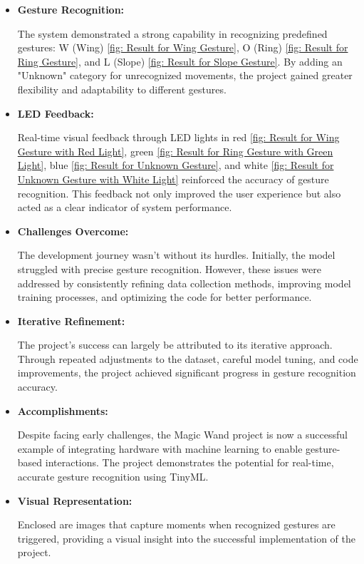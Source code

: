 \begin{itemize}
	
	\item \textbf{Gesture Recognition:}
	
	The system demonstrated a strong capability in recognizing predefined gestures: W (Wing) \ref{fig: Result for Wing Gesture}, O (Ring) \ref{fig: Result for Ring Gesture}, and L (Slope) \ref{fig: Result for Slope Gesture}. By adding an "Unknown" category for unrecognized movements, the project gained greater flexibility and adaptability to different gestures.
	
	\item \textbf{LED Feedback:}
	
	Real-time visual feedback through LED lights in red \ref{fig: Result for Wing Gesture with Red Light}, green \ref{fig: Result for Ring Gesture with Green Light}, blue \ref{fig: Result for Unknown Gesture}, and white \ref{fig: Result for Unknown Gesture with White Light} reinforced the accuracy of gesture recognition. This feedback not only improved the user experience but also acted as a clear indicator of system performance.
	
	\item \textbf{Challenges Overcome:}
	
	The development journey wasn't without its hurdles. Initially, the model struggled with precise gesture recognition. However, these issues were addressed by consistently refining data collection methods, improving model training processes, and optimizing the code for better performance.
	
	\item \textbf{Iterative Refinement:}
	
	The project’s success can largely be attributed to its iterative approach. Through repeated adjustments to the dataset, careful model tuning, and code improvements, the project achieved significant progress in gesture recognition accuracy.
	
	\item \textbf{Accomplishments:}
	
	Despite facing early challenges, the Magic Wand project is now a successful example of integrating hardware with machine learning to enable gesture-based interactions. The project demonstrates the potential for real-time, accurate gesture recognition using TinyML.
	
	\item \textbf{Visual Representation:}
	
	Enclosed are images that capture moments when recognized gestures are triggered, providing a visual insight into the successful implementation of the project.
	
\end{itemize}

